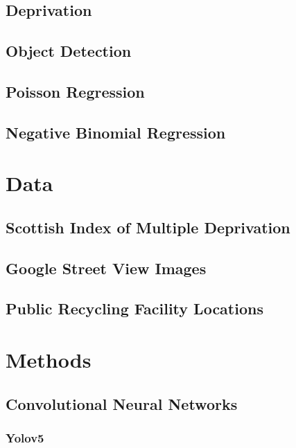 \documentclass{thesis}
\begin{document}
\section{Deprivation}
\section{Object Detection}
\section{Poisson Regression}
\section{Negative Binomial Regression}


\chapter{Data}

\section{Scottish Index of Multiple Deprivation}
\section{Google Street View Images}
\section{Public Recycling Facility Locations}


\chapter{Methods}

\section{Convolutional Neural Networks}
\subsection{Yolov5}
\end{document}
